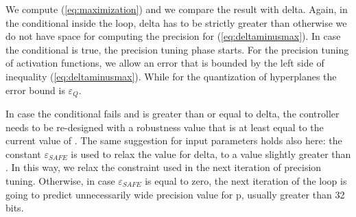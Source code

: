 We compute (\ref{eq:maximization}) and we compare the result with delta. Again, in the conditional inside the loop, delta has to be strictly greater than \maxUij\space otherwise we do not have space for computing the precision for (\ref{eq:deltaminusmax}). In case the conditional is true,
the precision tuning phase starts.
For the precision tuning of activation functions, we allow an error that is bounded by the left side of inequality (\autoref{eq:deltaminusmax}). While for the quantization of hyperplanes the error bound is $\varepsilon_{Q}$.

In case the conditional fails and \maxUij is greater than or equal to delta, the controller needs to be re-designed with a robustness value that is at least equal to the current value of \maxUij. The same suggestion for input parameters holds also here: the constant $\varepsilon_{SAFE}$ is used to relax the value for delta, to a value slightly greater than \maxUij. In this way, we relax the constraint used in the next iteration of precision tuning. Otherwise, in case $\varepsilon_{SAFE}$ is equal to zero, the next iteration of the loop is going to predict unnecessarily wide precision value for p, usually greater than 32 bits. 